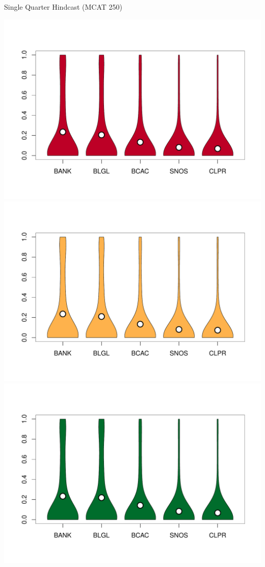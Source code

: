 \documentclass[ xcolor = pdftex, dvipsnames, table ]{beamer}
\begin{document}
\begin{frame}{Single Quarter Hindcast (MCAT 250)}
\begin{minipage}{0.29\textwidth}
\includegraphics[height=0.36\textheight]{../pictures/vioStarAvgOSBTWL.pdf}\\
\vspace*{-1.3cm}
\includegraphics[height=0.36\textheight]{../pictures/vioStarAvgOLATWL.pdf}\\
\vspace*{-1.3cm}
\includegraphics[height=0.36\textheight]{../pictures/vioStarAvgOSDTWL.pdf}
\end{minipage}
\end{frame}
\end{document}
